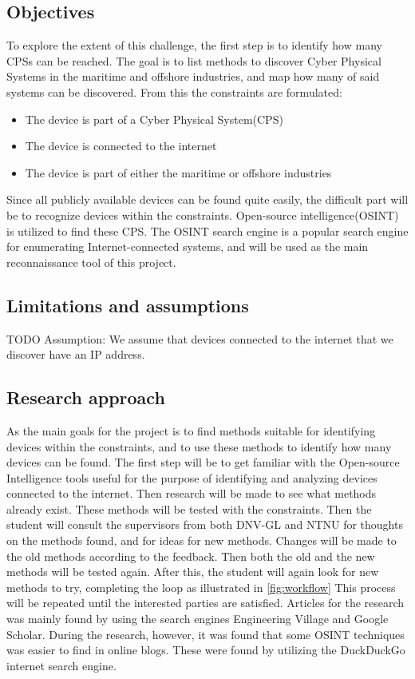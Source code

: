 \subsection{Objectives}
To explore the extent of this challenge, the first step is to identify how many CPSs can be reached. The goal is to list methods to discover Cyber Physical Systems in the maritime and offshore industries, and map how many of said systems can be discovered. From this the constraints are formulated:
\begin{itemize}
    \item The device is part of a Cyber Physical System(CPS)
    \item The device is connected to the internet
    \item The device is part of either the maritime or offshore industries
\end{itemize}
Since all publicly available devices can be found quite easily, the difficult part will be to recognize devices within the constraints.
Open-source intelligence(OSINT) is utilized to find these CPS. The OSINT search engine \href{https://shodan.io}{\color{blue}{Shodan}} is a popular search engine for enumerating Internet-connected systems, and will be used as the main reconnaissance tool of this project. 

\subsection{Limitations and assumptions}
TODO
Assumption: We assume that devices connected to the internet that we discover have an IP address.

\subsection{Research approach}
As the main goals for the project is to find methods suitable for identifying devices within the constraints, and to use these methods to identify how many devices can be found. The first step will be to get familiar with the Open-source Intelligence tools useful for the purpose of identifying and analyzing devices connected to the internet. Then research will be made to see what methods already exist. These methods will be tested with the constraints. Then the student will consult the supervisors from both DNV-GL and NTNU for thoughts on the methods found, and for ideas for new methods. Changes will be made to the old methods according to the feedback. Then both the old and the new methods will be tested again. After this, the student will again look for new methods to try, completing the loop as illustrated in \cref{fig:workflow} This process will be repeated until the interested parties are satisfied.
Articles for the research was mainly found by using the search engines Engineering Village\cite{engineering_village} and Google Scholar\cite{google_scholar}. During the research, however, it was found that some OSINT techniques was easier to find in online blogs. These were found by utilizing the DuckDuckGo internet search engine\cite{ddg}. 


